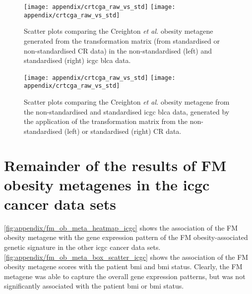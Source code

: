 \begin{appendices}
	\begin{figure}[h]
		\centering
		\texttt{[image: appendix/crtcga\_raw\_vs\_std]}
		\hfill
		\texttt{[image: appendix/crtcga\_raw\_vs\_std]}\\
		\caption[Comparison of the Creighton \textit{et al.} obesity metagene generated from the standardised or non-standardised TM]{Scatter plots comparing the Creighton \textit{et al.} obesity metagene generated from the transformation matrix (from standardised or non-standardised CR data) in the non-standardised (left) and standardised (right) \gls{icgc} \gls{blca} data.}
		\label{fig:appendix/check_raw_vs_std}
	\end{figure}

	\begin{figure}[h]
		\centering
		\texttt{[image: appendix/crtcga\_raw\_vs\_std]}
		\hfill
		\texttt{[image: appendix/crtcga\_raw\_vs\_std]}\\
		\caption[Comparison of the Creighton \textit{et al.} obesity metagene generated from the standardised or non-standardised  \gls{icgc} \gls{blca} data]{Scatter plots comparing the Creighton \textit{et al.} obesity metagene from the non-standardised  and standardised  \gls{icgc} \gls{blca} data, generated by the application of the transformation matrix from the non-standardised (left) or standardised (right) CR data.}
		\label{fig:appendix/check_raw_vs_std_tm}
	\end{figure}

	\section{Remainder of the results of FM obesity metagenes in the \gls{icgc} cancer data sets}
	\label{sec:rest_of_the_fm_icgc_cancer_heatmap_results}

	\cref{fig:appendix/fm_ob_meta_heatmap_icgc} shows the association of the FM obesity metagene with the gene expression pattern of the FM obesity-associated genetic signature in the other \gls{icgc} cancer data sets.
	\cref{fig:appendix/fm_ob_meta_box_scatter_icgc} shows the association of the FM obesity metagene scores with the patient \gls{bmi} and \gls{bmi} status.
	Clearly, the FM metagene was able to capture the overall gene expression patterns, but was not significantly associated with the patient \gls{bmi} or \gls{bmi} status.


\end{appendices}
